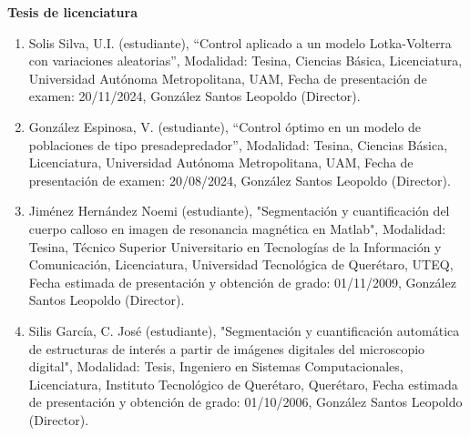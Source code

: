 \textbf{Tesis de licenciatura}

\begin{enumerate}

\item  Solis Silva, U.I. (estudiante), “Control aplicado a un modelo Lotka-Volterra con variaciones aleatorias”, Modalidad: 
Tesina, Ciencias Básica, Licenciatura, Universidad Autónoma Metropolitana, UAM, Fecha de presentación de examen: 20/11/2024, 
González Santos Leopoldo (Director).

\item  González Espinosa, V. (estudiante), “Control óptimo en un modelo de poblaciones de tipo presadepredador”, Modalidad: 
Tesina, Ciencias Básica, Licenciatura, Universidad Autónoma Metropolitana, UAM, Fecha de presentación de examen: 20/08/2024, 
González Santos Leopoldo (Director).

\item  Jiménez Hernández Noemi (estudiante), "Segmentación y cuantificación del cuerpo calloso en imagen de resonancia 
magnética 
en Matlab", Modalidad: Tesina, Técnico Superior Universitario en Tecnologías de la Información y Comunicación, Licenciatura, 
Universidad Tecnológica de Querétaro, UTEQ, Fecha estimada de presentación y obtención de grado: 01/11/2009, González Santos 
Leopoldo (Director).

\item  Silis García, C. José (estudiante), "Segmentación y cuantificación automática de estructuras de interés a partir de 
imágenes digitales del microscopio digital", Modalidad: Tesis, Ingeniero en Sistemas Computacionales, Licenciatura, Instituto 
Tecnológico de Querétaro, Querétaro, Fecha estimada de presentación y obtención de grado: 01/10/2006, González Santos 
Leopoldo (Director).

\end{enumerate}
